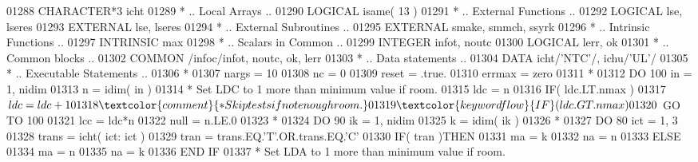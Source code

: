 \begin{DoxyCode}
01288       \textcolor{keywordtype}{CHARACTER*3}        icht
01289 \textcolor{comment}{*     .. Local Arrays ..}
01290       \textcolor{keywordtype}{LOGICAL}            isame( 13 )
01291 \textcolor{comment}{*     .. External Functions ..}
01292       \textcolor{keywordtype}{LOGICAL}            lse, lseres
01293       \textcolor{keywordtype}{EXTERNAL}           lse, lseres
01294 \textcolor{comment}{*     .. External Subroutines ..}
01295       \textcolor{keywordtype}{EXTERNAL}           smake, smmch, ssyrk
01296 \textcolor{comment}{*     .. Intrinsic Functions ..}
01297       \textcolor{keywordtype}{INTRINSIC}          max
01298 \textcolor{comment}{*     .. Scalars in Common ..}
01299       \textcolor{keywordtype}{INTEGER}            infot, noutc
01300       \textcolor{keywordtype}{LOGICAL}            lerr, ok
01301 \textcolor{comment}{*     .. Common blocks ..}
01302       \textcolor{keyword}{COMMON}             /infoc/infot, noutc, ok, lerr
01303 \textcolor{comment}{*     .. Data statements ..}
01304       \textcolor{keyword}{DATA}               icht/\textcolor{stringliteral}{'NTC'}/, ichu/\textcolor{stringliteral}{'UL'}/
01305 \textcolor{comment}{*     .. Executable Statements ..}
01306 \textcolor{comment}{*}
01307       nargs = 10
01308       nc = 0
01309       reset = .true.
01310       errmax = zero
01311 \textcolor{comment}{*}
01312       \textcolor{keywordflow}{DO} 100 in = 1, nidim
01313          n = idim( in )
01314 \textcolor{comment}{*        Set LDC to 1 more than minimum value if room.}
01315          ldc = n
01316          \textcolor{keywordflow}{IF}( ldc.LT.nmax )
01317      $      ldc = ldc + 1
01318 \textcolor{comment}{*        Skip tests if not enough room.}
01319          \textcolor{keywordflow}{IF}( ldc.GT.nmax )
01320      $      \textcolor{keywordflow}{GO TO} 100
01321          lcc = ldc*n
01322          null = n.LE.0
01323 \textcolor{comment}{*}
01324          \textcolor{keywordflow}{DO} 90 ik = 1, nidim
01325             k = idim( ik )
01326 \textcolor{comment}{*}
01327             \textcolor{keywordflow}{DO} 80 ict = 1, 3
01328                trans = icht( ict: ict )
01329                tran = trans.EQ.\textcolor{stringliteral}{'T'}.OR.trans.EQ.\textcolor{stringliteral}{'C'}
01330                \textcolor{keywordflow}{IF}( tran )\textcolor{keywordflow}{THEN}
01331                   ma = k
01332                   na = n
01333                \textcolor{keywordflow}{ELSE}
01334                   ma = n
01335                   na = k
01336 \textcolor{keywordflow}{               END IF}
01337 \textcolor{comment}{*              Set LDA to 1 more than minimum value if room.}

\end{DoxyCode}
